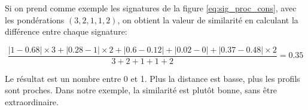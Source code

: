 Si on prend comme exemple les signatures de la figure \ref{eq:sig_proc_cons},
avec les pondérations $(3, 2, 1, 1, 2)$, on obtient la valeur de similarité en
calculant la différence entre chaque signature:

$$
\frac{|1-0.68|\times 3+|0.28-1|\times 2+|0.6-0.12|+|0.02-0|+|0.37-0.48|\times 2}{3 + 2 + 1 + 1 + 2}=0.35
$$

Le résultat est un nombre entre 0 et 1. Plus la distance est basse, plus les
profils sont proches. Dans notre exemple, la similarité est plutôt bonne, sans
être extraordinaire.
